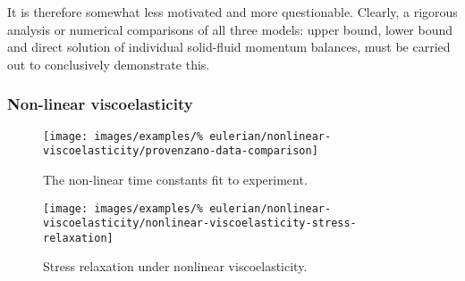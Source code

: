  It is therefore somewhat less motivated and more
questionable. Clearly, a rigorous analysis or numerical comparisons of
all three models: upper bound, lower bound and direct solution of
individual solid-fluid momentum balances, must be carried out to
conclusively demonstrate this.

\subsubsection{Non-linear viscoelasticity}
\label{non-linear-viscoelasticity}

\begin{figure}[!hptb]
\centering
\texttt{[image: images/examples/\%
eulerian/nonlinear-viscoelasticity/provenzano-data-comparison]}
\caption{The non-linear time constants fit to experiment.} 
\label{provenzano-data-fit}
\end{figure}

\begin{figure}[!hptb]
\centering
\texttt{[image: images/examples/\%
eulerian/nonlinear-viscoelasticity/nonlinear-viscoelasticity-stress-relaxation]}
\caption{Stress relaxation under nonlinear viscoelasticity.}
\label{nonlinear-viscoelasticity-stress-relaxation}
\end{figure}


%

